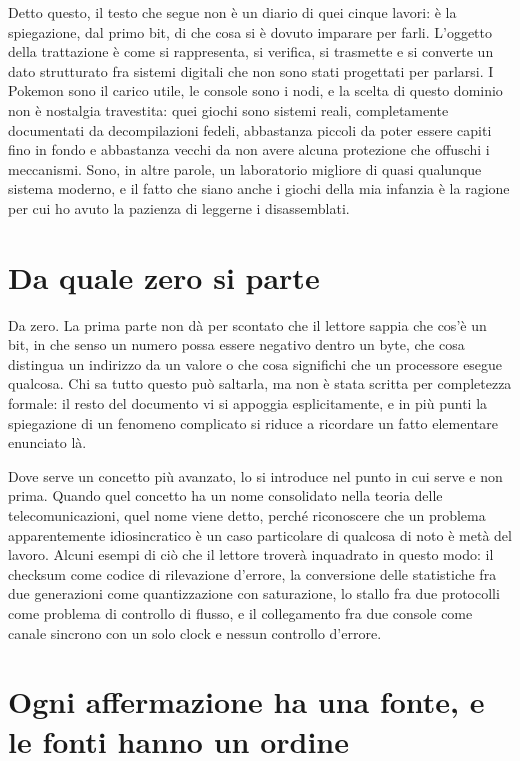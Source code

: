 Detto questo, il testo che segue non è un diario di quei cinque lavori: è la spiegazione, dal primo bit, di che cosa si è dovuto imparare per farli. L'oggetto della trattazione è come si rappresenta, si verifica, si trasmette e si converte un dato strutturato fra sistemi digitali che non sono stati progettati per parlarsi. I Pokemon sono il carico utile, le console sono i nodi, e la scelta di questo dominio non è nostalgia travestita: quei giochi sono sistemi reali, completamente documentati da decompilazioni fedeli, abbastanza piccoli da poter essere capiti fino in fondo e abbastanza vecchi da non avere alcuna protezione che offuschi i meccanismi. Sono, in altre parole, un laboratorio migliore di quasi qualunque sistema moderno, e il fatto che siano anche i giochi della mia infanzia è la ragione per cui ho avuto la pazienza di leggerne i disassemblati.

\section*{Da quale zero si parte}

Da zero. La prima parte non dà per scontato che il lettore sappia che cos'è un bit, in
che senso un numero possa essere negativo dentro un byte, che cosa distingua un
indirizzo da un valore o che cosa significhi che un processore esegue qualcosa. Chi sa
tutto questo può saltarla, ma non è stata scritta per completezza formale: il resto
del documento vi si appoggia esplicitamente, e in più punti la spiegazione di un
fenomeno complicato si riduce a ricordare un fatto elementare enunciato là.

Dove serve un concetto più avanzato, lo si introduce nel punto in cui serve e non
prima. Quando quel concetto ha un nome consolidato nella teoria delle
telecomunicazioni, quel nome viene detto, perché riconoscere che un problema
apparentemente idiosincratico è un caso particolare di qualcosa di noto è metà del
lavoro. Alcuni esempi di ciò che il lettore troverà inquadrato in questo modo: il
checksum come codice di rilevazione d'errore, la conversione delle statistiche fra due
generazioni come quantizzazione con saturazione, lo stallo fra due protocolli come
problema di controllo di flusso, e il collegamento fra due console come canale sincrono
con un solo clock e nessun controllo d'errore.

\section*{Ogni affermazione ha una fonte, e le fonti hanno un ordine}

